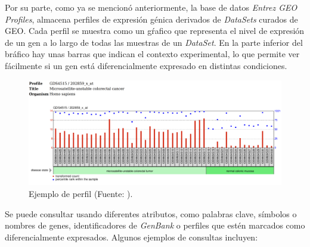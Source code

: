 Por su parte, como ya se mencionó anteriormente, la base de datos \textit{Entrez GEO Profiles}, almacena perfiles de expresión génica derivados de \textit{DataSets} curados de GEO.
Cada perfil se muestra como un gŕafico que representa el nivel de expresión de un gen a lo largo de todas las muestras de un \textit{DataSet}. En la parte inferior del bráfico hay unas
barras que indican el contexto experimental, lo que permite ver fácilmente si un gen está diferencialmente expresado en distintas condiciones. \newline

\begin{figure}[h]
    \centering
    \includegraphics[width=1\textwidth]{../img/geo-profile.png}
    \caption{Ejemplo de perfil (Fuente: \cite{geo-profile}).}  %
\end{figure}

Se puede consultar usando diferentes atributos, como palabras clave, símbolos o nombres de genes, identificadores de \textit{GenBank} o perfiles que estén marcados como diferencialmente expresados.
Algunos ejemplos de consultas incluyen:


